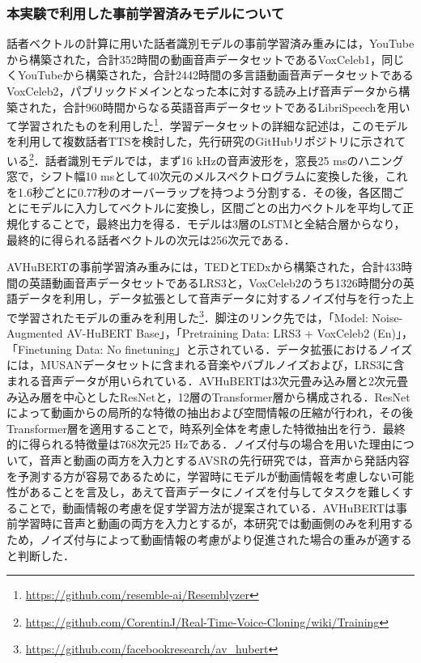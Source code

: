 \subsubsection{本実験で利用した事前学習済みモデルについて}
話者ベクトルの計算に用いた話者識別モデルの事前学習済み重みには，YouTubeから構築された，合計352時間の動画音声データセットであるVoxCeleb1\cite{nagrani2020voxceleb}，同じくYouTubeから構築された，合計2442時間の多言語動画音声データセットであるVoxCeleb2，パブリックドメインとなった本に対する読み上げ音声データから構築された，合計960時間からなる英語音声データセットであるLibriSpeech\cite{panayotov2015librispeech}を用いて学習されたものを利用した\footnote{\url{https://github.com/resemble-ai/Resemblyzer}}．学習データセットの詳細な記述は，このモデルを利用して複数話者TTSを検討した，先行研究\cite{jia2018transfer}のGitHubリポジトリに示されている\footnote{\url{https://github.com/CorentinJ/Real-Time-Voice-Cloning/wiki/Training}}．話者識別モデルでは，まず16 kHzの音声波形を，窓長25 msのハニング窓で，シフト幅10 msとして40次元のメルスペクトログラムに変換した後，これを1.6秒ごとに0.77秒のオーバーラップを持つよう分割する．その後，各区間ごとにモデルに入力してベクトルに変換し，区間ごとの出力ベクトルを平均して正規化することで，最終出力を得る．モデルは3層のLSTMと全結合層からなり，最終的に得られる話者ベクトルの次元は256次元である．

AVHuBERTの事前学習済み重みには，TEDとTEDxから構築された，合計433時間の英語動画音声データセットであるLRS3と，VoxCeleb2のうち1326時間分の英語データを利用し，データ拡張として音声データに対するノイズ付与を行った上で学習されたモデル\cite{shi2022robust}の重みを利用した\footnote{\url{https://github.com/facebookresearch/av_hubert}}．脚注のリンク先では，「Model: Noise-Augmented AV-HuBERT Base」，「Pretraining Data: LRS3 + VoxCeleb2 (En)」，「Finetuning Data: No finetuning」と示されている．データ拡張におけるノイズには，MUSANデータセット\cite{snyder2015musan}に含まれる音楽やバブルノイズおよび，LRS3に含まれる音声データが用いられている．AVHuBERTは3次元畳み込み層と2次元畳み込み層を中心としたResNetと，12層のTransformer層から構成される．ResNetによって動画からの局所的な特徴の抽出および空間情報の圧縮が行われ，その後Transformer層を適用することで，時系列全体を考慮した特徴抽出を行う．最終的に得られる特徴量は768次元25 Hzである．ノイズ付与の場合を用いた理由について，音声と動画の両方を入力とするAVSRの先行研究\cite{afouras2018deep}では，音声から発話内容を予測する方が容易であるために，学習時にモデルが動画情報を考慮しない可能性があることを言及し，あえて音声データにノイズを付与してタスクを難しくすることで，動画情報の考慮を促す学習方法が提案されている．AVHuBERTは事前学習時に音声と動画の両方を入力とするが，本研究では動画側のみを利用するため，ノイズ付与によって動画情報の考慮がより促進された場合の重みが適すると判断した．

